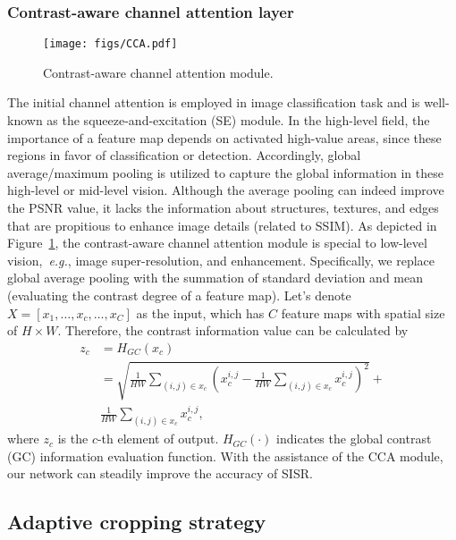 \documentclass[sigconf]{acmart}
\newcommand{\eg}{\emph{e.g.}}
\begin{document}
\subsubsection{Contrast-aware channel attention layer}
\begin{figure}[htpb]
	\centering
	\texttt{[image: figs/CCA.pdf]}
	\vspace{-3mm}
	\caption{Contrast-aware channel attention module.}
	\label{fig:cca}
\end{figure}
The initial channel attention is employed in image classification task and is well-known as the squeeze-and-excitation (SE) module. In the high-level field, the importance of a feature map depends on activated high-value areas, since these regions in favor of classification or detection. Accordingly, global average/maximum pooling is utilized to capture the global information in these high-level or mid-level vision. Although the average pooling can indeed improve the PSNR value, it lacks the information about structures, textures, and edges that are propitious to enhance image details (related to SSIM). As depicted in Figure~\ref{fig:cca}, the contrast-aware channel attention module is special to low-level vision,~\eg, image super-resolution, and enhancement. Specifically, we replace global average pooling with the summation of standard deviation and mean (evaluating the contrast degree of a feature map). Let's denote $X = \left[ {{x_1}, \ldots ,{x_c}, \ldots ,{x_C}} \right]$ as the input, which has $C$ feature maps with spatial size of $H \times W$. Therefore, the contrast information value can be calculated by
\begin{equation}
\begin{aligned}
{z_c} &= {H_{GC}}\left( {{x_c}} \right) \\&= \sqrt {\frac{1}{{HW}} {\sum\limits_{\left( {i,j} \right) \in {x_c}} {{{\left( {x_c^{i,j} - \frac{1}{{HW}}\sum\limits_{\left( {i,j} \right) \in {x_c}} {x_c^{i,j}} } \right)}^2}} } } + \\ 
&\frac{1}{{HW}}\sum\limits_{\left( {i,j} \right) \in {x_c}} {x_c^{i,j}},
\end{aligned}
\end{equation}
where ${z_c}$ is the $c$-th element of output. ${H_{GC}}\left(  \cdot  \right)$ indicates the global contrast (GC) information evaluation function. With the assistance of the CCA module, our network can steadily improve the accuracy of SISR.

\subsection{Adaptive cropping strategy}
\end{document}
